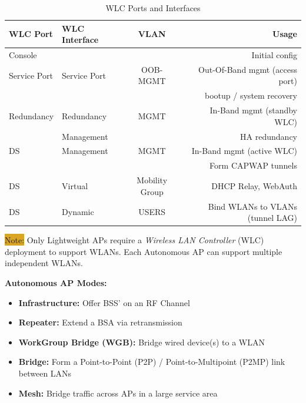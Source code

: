 \documentclass[12pt]{article}
\newcommand{\note}[1]{\colorbox{#1}{Note:}}
\begin{document}
	\begin{table}[H]
	\centering
	\caption{WLC Ports and Interfaces \label{tab:WLC PORTS}}
	\begin{tabular}{llcr}
	\hline
	\textbf{WLC Port}	& \textbf{WLC Interface}	& \textbf{VLAN}		& \textbf{Usage}\\\hline
	Console		&					&				& Initial config\\\hline
	Service Port		& Service Port			& OOB-MGMT		& Out-Of-Band mgmt (access port)\\
				&					&				& bootup / system recovery\\\hline
	Redundancy	& Redundancy			& MGMT			& In-Band mgmt (standby WLC)\\
				& Management			&				& HA redundancy\\\hline
	DS			& Management			& MGMT			& In-Band mgmt (active WLC)\\
				&					&				& Form CAPWAP tunnels\\\hline
	DS			& Virtual				& Mobility Group		& DHCP Relay, WebAuth\\\hline
	DS			& Dynamic				& USERS			& Bind WLANs to VLANs (tunnel LAG)\\\hline
	\end{tabular}\end{table}
	\note{Goldenrod} Only Lightweight APs require a \textit{Wireless LAN Controller} (WLC) deployment to support WLANs. Each Autonomous AP can support multiple independent WLANs.

	\textbf{Autonomous AP Modes:}
	\begin{itemize} \itemsep -5pt
		\label{itm:AUTONOMOUS AP}
		\item{\textbf{Infrastructure:} Offer BSS' on an RF Channel}
		\item{\textbf{Repeater:} Extend a BSA via retransmission}
		\item{\textbf{WorkGroup Bridge (WGB):} Bridge wired device(s) to a WLAN}
		\item{\textbf{Bridge:} Form a Point-to-Point (P2P) / Point-to-Multipoint (P2MP) link between LANs}
		\item{\textbf{Mesh:} Bridge traffic across APs in a large service area}
	\end{itemize}
\end{document}
